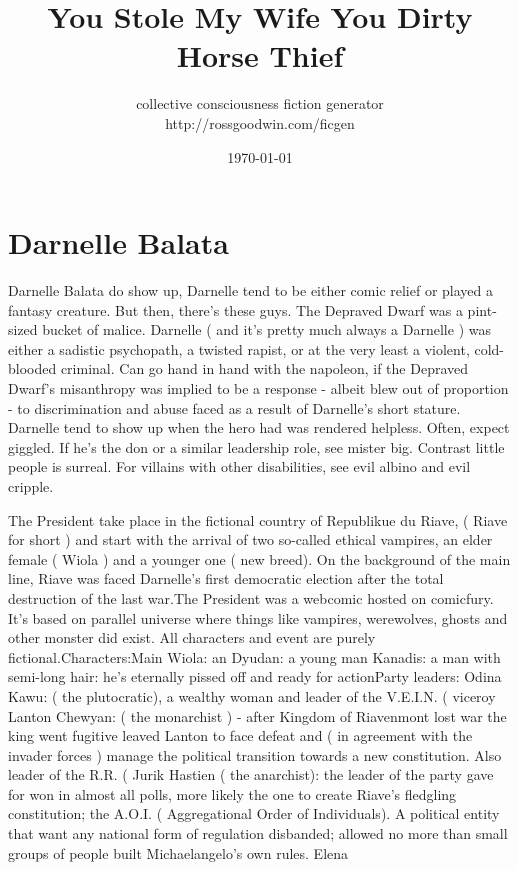 \documentclass[12pt]{book}
\title{You Stole My Wife You Dirty Horse Thief}
\author{collective consciousness fiction generator\\http://rossgoodwin.com/ficgen}
\date{\today}
\begin{document}
\maketitle



\chapter{Darnelle Balata}

Darnelle Balata do show up, Darnelle tend to be either comic relief or played a fantasy creature. But then, there's these guys. The Depraved Dwarf was a pint-sized bucket of malice. Darnelle ( and it's pretty much always a Darnelle ) was either a sadistic psychopath, a twisted rapist, or at the very least a violent, cold-blooded criminal. Can go hand in hand with the napoleon, if the Depraved Dwarf's misanthropy was implied to be a response - albeit blew out of proportion - to discrimination and abuse faced as a result of Darnelle's short stature. Darnelle tend to show up when the hero had was rendered helpless. Often, expect giggled. If he's the don or a similar leadership role, see mister big. Contrast little people is surreal. For villains with other disabilities, see evil albino and evil cripple.



The President take place in the fictional country of Republikue du Riave, ( Riave for short ) and start with the arrival of two so-called ethical vampires, an elder female ( Wiola ) and a younger one ( new breed). On the background of the main line, Riave was faced Darnelle's first democratic election after the total destruction of the last war.The President was a webcomic hosted on comicfury. It's based on parallel universe where things like vampires, werewolves, ghosts and other monster did exist. All characters and event are purely fictional.Characters:Main Wiola: an Dyudan: a young man Kanadis: a man with semi-long hair: he's eternally pissed off and ready for actionParty leaders: Odina Kawu: ( the plutocratic), a wealthy woman and leader of the V.E.I.N. (  viceroy Lanton Chewyan: ( the monarchist ) - after Kingdom of Riavenmont lost war the king went fugitive leaved Lanton to face defeat and ( in agreement with the invader forces ) manage the political transition towards a new constitution. Also leader of the R.R. (  Jurik Hastien ( the anarchist): the leader of the party gave for won in almost all polls, more likely the one to create Riave's fledgling constitution; the A.O.I. ( Aggregational Order of Individuals). A political entity that want any national form of regulation disbanded; allowed no more than small groups of people built Michaelangelo's own rules. Elena
\end{document}
